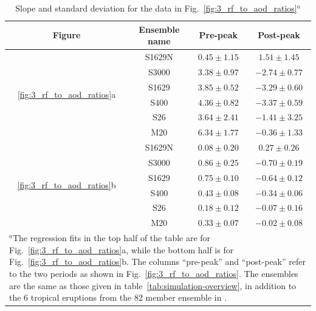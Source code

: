 \documentclass[draft]{agujournal2019}
\begin{document}
  \begin{table}
    \centering

    \caption{Slope and standard deviation for the data in
      Fig.~\ref{fig:3_rf_to_aod_ratios}\(^{a}\)}\label{tab:slope-gradients}%
    \begin{tabular}{cccc}
      \toprule
      Figure & Ensemble name & Pre-peak & Post-peak \\
      \midrule
      & S1629N & \(0.45\pm1.15\) & \(1.51\pm1.45\) \\
      & S3000 & \(3.38\pm0.97\) & \(-2.74\pm0.77\) \\
      \multirow{2}{*}{\ref{fig:3_rf_to_aod_ratios}a} & S1629 & \(3.85\pm0.52\) & \(-3.29\pm0.60\) \\
      & S400 & \(4.36\pm0.82\) & \(-3.37\pm0.59\) \\
      & S26 & \(3.64\pm2.41\) & \(-1.41\pm3.25\) \\
      & M20 & \(6.34\pm1.77\) & \(-0.36\pm1.33\) \\
      \midrule
      & S1629N & \(0.08\pm0.20\) & \(0.27\pm0.26\) \\
      & S3000 & \(0.86\pm0.25\) & \(-0.70\pm0.19\) \\
      \multirow{2}{*}{\ref{fig:3_rf_to_aod_ratios}b} & S1629 & \(0.75\pm0.10\) & \(-0.64\pm0.12\) \\
      & S400 & \(0.43\pm0.08\) & \(-0.34\pm0.06\) \\
      & S26 & \(0.18\pm0.12\) & \(-0.07\pm0.16\) \\
      & M20 & \(0.33\pm0.07\) & \(-0.02\pm0.08\) \\
      \toprule
      \multicolumn{4}{l}{\parbox{0.6\linewidth}{\(^{a}\)The regression fits in the top half of the table are for
          Fig.~\ref{fig:3_rf_to_aod_ratios}a, while the bottom half is for
          Fig.~\ref{fig:3_rf_to_aod_ratios}b. The columns ``pre-peak'' and ``post-peak'' refer to
          the two periods as shown in Fig.~\ref{fig:3_rf_to_aod_ratios}. The ensembles are the
          same as those given in table~\ref{tab:simulation-overview}, in addition to the \(6\)
          tropical eruptions from the \(82\) member ensemble in
          .}} \\
    \end{tabular}
  \end{table}
\end{document}
